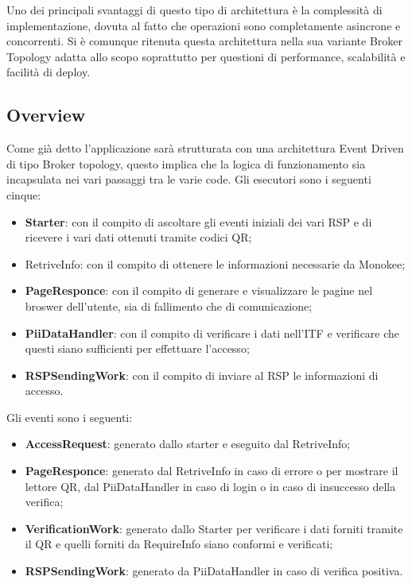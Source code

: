 Uno dei principali svantaggi di questo tipo di architettura è la complessità di implementazione, dovuta al fatto che operazioni sono completamente asincrone e concorrenti. Si è comunque ritenuta questa architettura nella sua variante Broker Topology adatta allo scopo soprattutto per questioni di performance, scalabilità e facilità di deploy.

\subsection{Overview}
Come già detto l’applicazione sarà strutturata con una architettura Event Driven di tipo Broker topology, questo implica che la logica di funzionamento sia incapsulata nei vari passaggi tra le varie code.
Gli esecutori sono i seguenti cinque:
\begin{itemize}
    \item \textbf{Starter}: con il compito di ascoltare gli eventi iniziali dei vari RSP e di ricevere i vari dati ottenuti tramite codici QR;
    \item RetriveInfo: con il compito di ottenere le informazioni necessarie da Monokee;
    \item \textbf{PageResponce}: con il compito di generare e visualizzare le pagine nel broswer dell’utente, sia di fallimento che di comunicazione;
    \item \textbf{PiiDataHandler}: con il compito di verificare i dati nell’ITF e verificare che questi siano sufficienti per effettuare l’accesso;
    \item \textbf{RSPSendingWork}: con il compito di inviare al RSP le informazioni di accesso.
\end{itemize}
    
Gli eventi sono i seguenti:
\begin{itemize}
    \item \textbf{AccessRequest}: generato dallo starter e eseguito dal RetriveInfo;
    \item \textbf{PageResponce}: generato dal RetriveInfo in caso di errore o per mostrare il lettore QR, dal PiiDataHandler in caso di login o in caso di insuccesso della verifica;
    \item \textbf{VerificationWork}: generato dallo Starter per verificare i dati forniti tramite il QR e quelli forniti da RequireInfo siano conformi e verificati; 
    \item \textbf{RSPSendingWork}: generato da PiiDataHandler in caso di verifica positiva.
\end{itemize}
    
